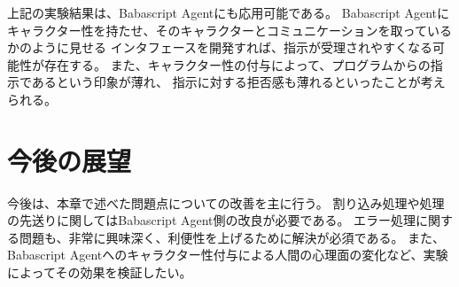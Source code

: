 上記の実験結果は、Babascript Agentにも応用可能である。 Babascript
Agentにキャラクター性を持たせ、そのキャラクターとコミュニケーションを取っているかのように見せる
インタフェースを開発すれば、指示が受理されやすくなる可能性が存在する。
また、キャラクター性の付与によって、プログラムからの指示であるという印象が薄れ、
指示に対する拒否感も薄れるといったことが考えられる。

\section{今後の展望}\label{ux4ecaux5f8cux306eux5c55ux671b}

今後は、本章で述べた問題点についての改善を主に行う。
割り込み処理や処理の先送りに関してはBabascript
Agent側の改良が必要である。
エラー処理に関する問題も、非常に興味深く、利便性を上げるために解決が必須である。
また、Babascript
Agentへのキャラクター性付与による人間の心理面の変化など、実験によってその効果を検証したい。
